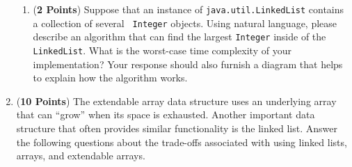 \documentclass[12pt]{article}
\begin{document}
\begin{enumerate}
\begin{enumerate}
\item ({\bf 2 Points}) Suppose that an instance of {\tt java.util.LinkedList} contains a collection of several {\tt
    Integer} objects.  Using natural language, please describe an algorithm that can find the largest {\tt Integer}
  inside of the {\tt LinkedList}.  What is the worst-case time complexity of your implementation?  Your response should
  also furnish a diagram that helps to explain how the algorithm works.

\end{enumerate}

\newpage

\item ({\bf 10 Points}) The extendable array data structure uses an underlying array that can ``grow'' when its space is
  exhausted.  Another important data structure that often provides similar functionality is the linked list.  Answer the
  following questions about the trade-offs associated with using linked lists, arrays, and extendable arrays.

  \begin{enumerate}






\end{enumerate}
\end{enumerate}
\end{document}
